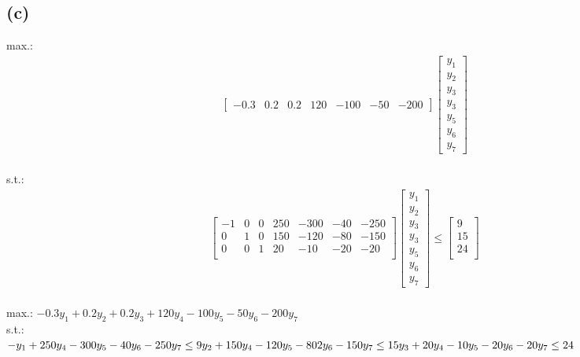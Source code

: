 \documentclass[a4paper]{scrartcl}
\begin{document}
\subsection*{(c)}
max.:\\
\begin{align}
			\begin{bmatrix}
-0.3 &0.2&0.2&120&-100&-50&-200
\end{bmatrix}
			\begin{bmatrix}
y_1\\
y_2\\
y_3\\
y_3\\
y_5\\
y_6\\
y_7
\end{bmatrix}
\end{align}\\
s.t.:\\
\begin{align}
\begin{bmatrix}
-1 &0&0&250&-300&-40&-250\\
0 &1&0&150&-120&-80&-150\\
0 &0&1&20&-10&-20&-20\\
\end{bmatrix}
			\begin{bmatrix}
y_1\\
y_2\\
y_3\\
y_3\\
y_5\\
y_6\\
y_7
\end{bmatrix}
\leq
			\begin{bmatrix}
9\\
15\\
24\\
\end{bmatrix}
\end{align}
\\
max.:
$-0.3y_1 + 0.2y_2 + 0.2 y_3 + 120 y_4 - 100y_5 - 50 y_6 - 200 y_7$\\
s.t.:\\
$
-y_1 + 250y_4 - 300 y_5 - 40 y_6 - 250 y_7 \leq 9\\
y_2 + 150 y_4 - 120 y_5 - 802 y_6 - 150 y_7 \leq 15\\
y_3 + 20y_4 - 10y_5 - 20 y_6 - 20 y_7 \leq 24
$
\end{document}
